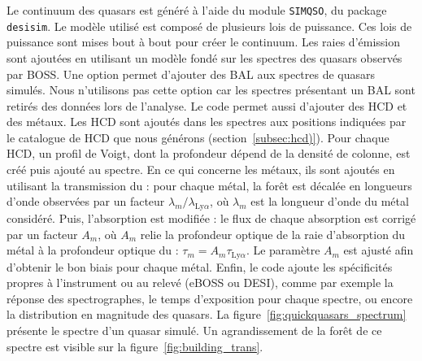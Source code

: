Le continuum des quasars est généré à l'aide du module \texttt{SIMQSO}, du package \texttt{desisim}.
Le modèle utilisé est composé de plusieurs lois de puissance. Ces lois de puissance sont mises bout à bout pour créer le continuum.
Les raies d'émission sont ajoutées en utilisant un modèle fondé sur les spectres des quasars observés par BOSS.
Une option permet d'ajouter des BAL aux spectres de quasars simulés. Nous n'utilisons pas cette option car les spectres présentant un BAL sont retirés des données lors de l'analyse.
Le code permet aussi d'ajouter des HCD et des métaux. Les HCD sont ajoutés dans les spectres aux positions indiquées par le catalogue de HCD que nous générons (section~\ref{subsec:hcd)}). Pour chaque HCD, un profil de Voigt, dont la profondeur dépend de la densité de colonne, est créé puis ajouté au spectre.
En ce qui concerne les métaux, ils sont ajoutés en utilisant la transmission du \lya{} : pour chaque métal, la forêt \lya{} est décalée en longueurs d'onde observées par un facteur $\lambda_m / \lambda_{\mathrm{Ly}\alpha}$, où $\lambda_m$ est la longueur d'onde du métal considéré.
Puis, l'absorption est modifiée : 
le flux de chaque absorption est corrigé par un facteur $A_m$, où $A_m$ relie la profondeur optique de la raie d'absorption du métal à la profondeur optique du \lya{} : $\tau_m = A_m \tau_{\mathrm{Ly}\alpha}$. Le paramètre $A_m$ est ajusté afin d'obtenir le bon biais pour chaque métal.
Enfin, le code ajoute les spécificités propres à l'instrument ou au relevé (eBOSS ou DESI), comme par exemple la réponse des spectrographes, le temps d'exposition pour chaque spectre, ou encore la distribution en magnitude des quasars.
La figure~\ref{fig:quickquasars_spectrum} présente le spectre d'un quasar simulé. Un agrandissement de la forêt \lya{} de ce spectre est visible sur la figure~\ref{fig:building_trans}.

